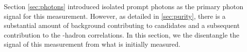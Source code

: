 Section \ref{sec:photons} introduced isolated prompt photons as the primary photon signal for this measurement. However, as detailed in \ref{sec:purity}, there is a substantial amount of background contributing to \gammaiso candidates and a subsequent contribution to the \gammaiso-hadron correlations. In this section, we the disentangle the signal of this measurement from what is initially measured.\\ 

